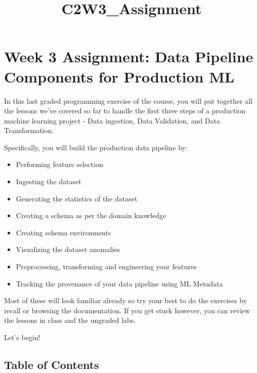 \documentclass[11pt]{article}
\title{C2W3\_Assignment}
\providecommand{\tightlist}{%
      \setlength{\itemsep}{0pt}\setlength{\parskip}{0pt}}
\begin{document}
    
    \maketitle
    
    

    
    \hypertarget{week-3-assignment-data-pipeline-components-for-production-ml}{%
\section{Week 3 Assignment: Data Pipeline Components for Production
ML}\label{week-3-assignment-data-pipeline-components-for-production-ml}}

In this last graded programming exercise of the course, you will put
together all the lessons we've covered so far to handle the first three
steps of a production machine learning project - Data ingestion, Data
Validation, and Data Transformation.

Specifically, you will build the production data pipeline by:

\begin{itemize}
\tightlist
\item
  Performing feature selection
\item
  Ingesting the dataset
\item
  Generating the statistics of the dataset
\item
  Creating a schema as per the domain knowledge
\item
  Creating schema environments
\item
  Visualizing the dataset anomalies
\item
  Preprocessing, transforming and engineering your features
\item
  Tracking the provenance of your data pipeline using ML Metadata
\end{itemize}

Most of these will look familiar already so try your best to do the
exercises by recall or browsing the documentation. If you get stuck
however, you can review the lessons in class and the ungraded labs.

Let's begin!

    \hypertarget{table-of-contents}{%
\subsection{Table of Contents}\label{table-of-contents}}
\end{document}
